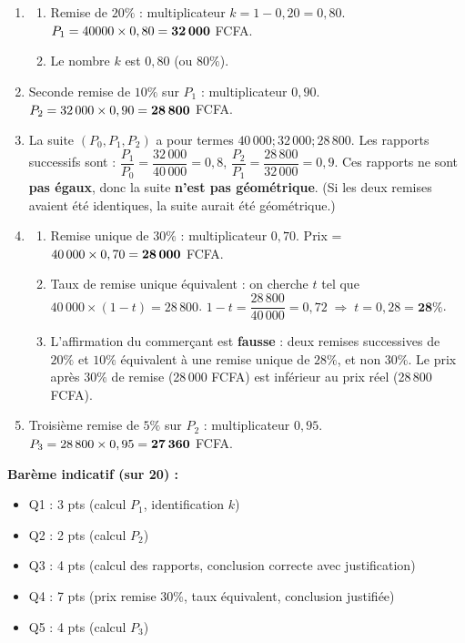 \documentclass[11pt]{article}
\newcommand{\cle}[1]{{\popxbold\color{popdark}#1}}
\begin{document}
\begin{corrige}
\begin{enumerate}
\item \begin{enumerate}
      \item Remise de $20\%$ : multiplicateur $k = 1 - 0,20 = 0,80$.
        $P_1 = 40000 \times 0,80 = \textbf{32\,000}$ FCFA.
      \item Le nombre $k$ est $0,80$ (ou $80\%$).
    \end{enumerate}
\item Seconde remise de $10\%$ sur $P_1$ : multiplicateur $0,90$.
  $P_2 = 32\,000 \times 0,90 = \textbf{28\,800}$ FCFA.
\item La suite $(P_0, P_1, P_2)$ a pour termes $40\,000 ; 32\,000 ; 28\,800$.
  Les rapports successifs sont :
  $\dfrac{P_1}{P_0} = \dfrac{32\,000}{40\,000} = 0,8$,
  $\dfrac{P_2}{P_1} = \dfrac{28\,800}{32\,000} = 0,9$.
  Ces rapports ne sont \textbf{pas égaux}, donc la suite \textbf{n'est pas \cle{géométrique}}.
  (Si les deux remises avaient été identiques, la suite aurait été géométrique.)
\item \begin{enumerate}
      \item Remise unique de $30\%$ : multiplicateur $0,70$.
        Prix = $40\,000 \times 0,70 = \textbf{28\,000}$ FCFA.
      \item Taux de remise unique équivalent : on cherche $t$ tel que $40\,000 \times (1-t) = 28\,800$.
        $1-t = \dfrac{28\,800}{40\,000} = 0,72 \;\Rightarrow\; t = 0,28 = \textbf{28\%}$.
      \item L'affirmation du commerçant est \textbf{fausse} : deux remises successives de $20\%$ et $10\%$ équivalent à une remise unique de $28\%$, et non $30\%$. Le prix après $30\%$ de remise (28\,000 FCFA) est inférieur au prix réel (28\,800 FCFA).
    \end{enumerate}
\item Troisième remise de $5\%$ sur $P_2$ : multiplicateur $0,95$.
  $P_3 = 28\,800 \times 0,95 = \textbf{27\,360}$ FCFA.
\end{enumerate}

\textbf{Barème indicatif (sur 20) :}
\begin{itemize}
\item Q1 : 3 pts (calcul $P_1$, identification $k$)
\item Q2 : 2 pts (calcul $P_2$)
\item Q3 : 4 pts (calcul des rapports, conclusion correcte avec justification)
\item Q4 : 7 pts (prix remise 30\%, taux équivalent, conclusion justifiée)
\item Q5 : 4 pts (calcul $P_3$)
\end{itemize}


\end{corrige}
\end{document}
